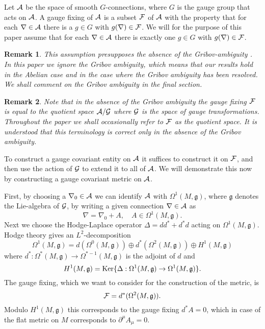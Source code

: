 \documentclass[letterpaper,11pt]{article}
\def\ca{{\cal A}}
\def\cf{{\cal F}}
\def\cg{{\cal G}}
\newtheorem{remark}{Remark}
\begin{document}
Let $\ca$ be the space of smooth $G$-connections, where $G$ is the gauge group that acts on $\ca$. A gauge fixing of $\ca$ is a subset $\cf$ of $\ca$ with the property that for each $\nabla \in \ca$ there is a $g\in G$ with $g(\nabla )\in \cf$. We will for the  purpose of this paper assume that for each $\nabla \in \ca$ there is exactly  one $g\in G$  with $g(\nabla )\in \cf$. 
\begin{remark}
This assumption presupposes the absence of the Gribov-ambiguity \cite{Gribov:1977wm,Singer:1978dk}. In this paper we ignore the Gribov ambiguity, which means that our results hold in the Abelian case and in the case where the Gribov ambiguity has been resolved. We shall comment on the Gribov ambiguity in the final section. 
\end{remark}
\begin{remark}
Note that in the absence of the Gribov ambiguity the gauge fixing $\cf$ is equal to the quotient space $\ca/\cg$ where $\cg$ is the space of gauge transformations. Throughout the paper we shall occasionally refer to $\cf$ as the quotient space. It is understood that this terminology is correct only in the absence of the Gribov ambiguity.
\end{remark}
To construct a gauge covariant entity on $\ca$ it suffices to construct it on $\cf$, and then use the action of $\cg$ to extend it to all of $\ca$.
We will demonstrate this now  by constructing a gauge covariant metric on $\ca$.



First, by choosing a $\nabla_0 \in \ca$ we can identify $\ca$ with $\Omega^1(M,\mathfrak{g})$, where $\mathfrak{g}$ denotes the Lie-algebra of $\cg$, by writing a given connection $\nabla \in \ca$ as
$$\nabla=\nabla_0+A, \quad A\in \Omega^1(M,\mathfrak{g}). $$
Next we choose the Hodge-Laplace operator $\Delta=dd^*+d^*d$ acting on $\Omega^1(M,\mathfrak{g})$. Hodge theory gives an $L^2$-decomposition 
$$\Omega^1(M,\mathfrak{g})=d(\Omega^0(M,\mathfrak{g}))\oplus  d^*(\Omega^2(M,\mathfrak{g}))\oplus H^1(M,\mathfrak{g}) $$
where $d^* :\Omega^*(M,\mathfrak{g}) \to \Omega^{*-1}(M,\mathfrak{g})$ is the adjoint of $d$ and   
$$H^1(M,\mathfrak{g}) =\hbox{Ker}\{  \Delta :\Omega^1(M,\mathfrak{g})\to \Omega^1(M,\mathfrak{g})  \}.$$
The gauge fixing, which we want to consider for the construction of the metric, is 
$$\cf=d^* (\Omega^2 (M,\mathfrak{g})) .$$
Modulo $H^1(M,\mathfrak{g})$ this corresponds to the gauge fixing $d^*A=0$, which in case of the flat metric on $M$ corresponds to $\partial^\mu A_\mu=0$.
\end{document}
